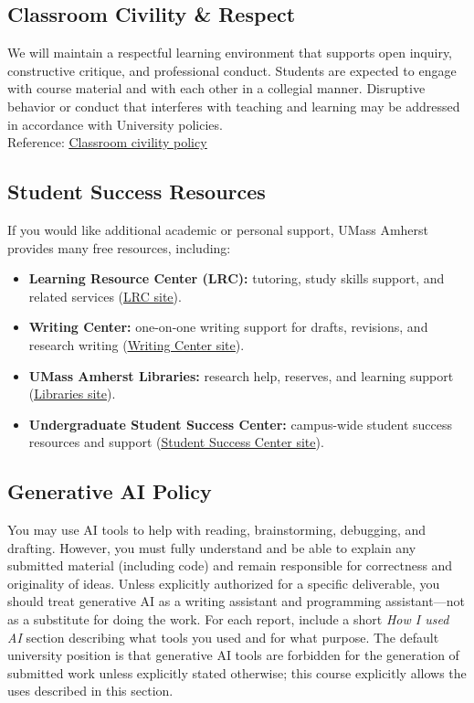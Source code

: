 \documentclass[11pt]{article}
\newcommand{\link}[2]{\href{#1}{\uline{#2}}}
\begin{document}
\subsection*{Classroom Civility \& Respect}
We will maintain a respectful learning environment that supports open inquiry, constructive critique, and professional conduct. Students are expected to engage with course material and with each other in a collegial manner. Disruptive behavior or conduct that interferes with teaching and learning may be addressed in accordance with University policies. \\
Reference: \link{https://www.umass.edu/dean_students/campus-policies/classroom}{Classroom civility policy}

\subsection*{Student Success Resources}
If you would like additional academic or personal support, UMass Amherst provides many free resources, including:
\begin{itemize}
  \item \textbf{Learning Resource Center (LRC):} tutoring, study skills support, and related services (\link{https://www.umass.edu/lrc/}{LRC site}).
  \item \textbf{Writing Center:} one-on-one writing support for drafts, revisions, and research writing (\link{https://www.umass.edu/writing-center/}{Writing Center site}).
  \item \textbf{UMass Amherst Libraries:} research help, reserves, and learning support (\link{https://www.library.umass.edu/}{Libraries site}).
  \item \textbf{Undergraduate Student Success Center:} campus-wide student success resources and support (\link{https://www.umass.edu/studentsuccess/}{Student Success Center site}).
\end{itemize}

\subsection*{Generative AI Policy}
You may use AI tools to help with reading, brainstorming, debugging, and drafting. However, you must fully understand and be able to explain any submitted material (including code) and remain responsible for correctness and originality of ideas. Unless explicitly authorized for a specific deliverable, you should treat generative AI as a writing assistant and programming assistant---not as a substitute for doing the work. For each report, include a short \textit{How I used AI} section describing what tools you used and for what purpose. The default university position is that generative AI tools are forbidden for the generation of submitted work unless explicitly stated otherwise; this course explicitly allows the uses described in this section.
\end{document}
